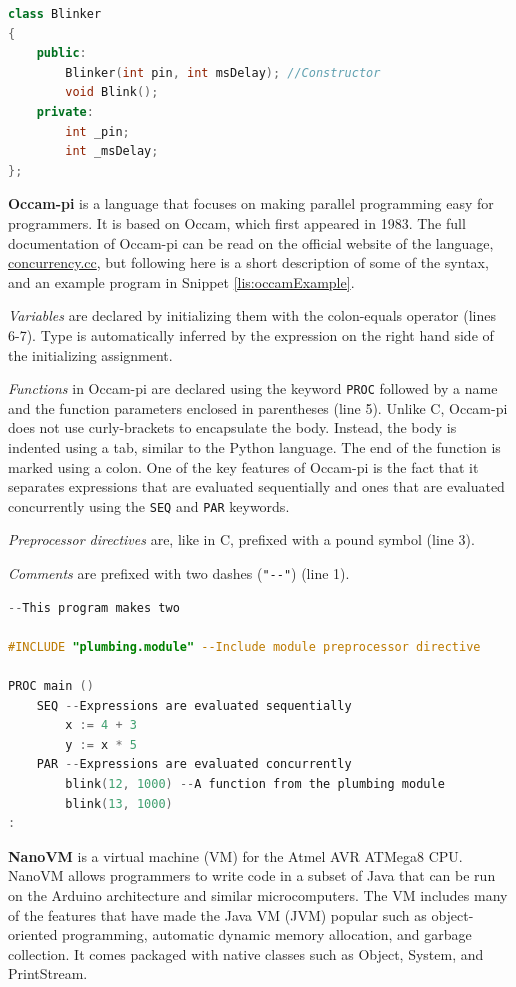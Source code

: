 \begin{lstlisting}[language=C++,label=lis:arduinoHeader,caption=The Blinker.h header file.,firstnumber=1]
class Blinker
{
	public:
		Blinker(int pin, int msDelay); //Constructor
		void Blink();
	private:
		int _pin;
		int _msDelay;
};
\end{lstlisting}

\textbf{Occam-pi} is a language that focuses on making parallel programming easy for programmers.
It is based on Occam, which first appeared in 1983.
The full documentation of Occam-pi can be read on the official website of the language, \url{concurrency.cc}, but following here is a short description of some of the syntax, and an example program in Snippet \ref{lis:occamExample}.

\textit{Variables} are declared by initializing them with the colon-equals operator (lines 6-7). 
Type is automatically inferred by the expression on the right hand side of the initializing assignment.

\textit{Functions} in Occam-pi are declared using the keyword \texttt{PROC} followed by a name and the function parameters enclosed in parentheses (line 5).
Unlike C, Occam-pi does not use curly-brackets to encapsulate the body.
Instead, the body is indented using a tab, similar to the Python language.
The end of the function is marked using a colon.
One of the key features of Occam-pi is the fact that it separates expressions that are evaluated sequentially and ones that are evaluated concurrently using the \texttt{SEQ} and \texttt{PAR} keywords.

\textit{Preprocessor directives} are, like in C, prefixed with a pound symbol (line 3).

\textit{Comments} are prefixed with two dashes (\texttt{"{-}{-}"}) (line 1).

\begin{lstlisting}[language=C,label=lis:occamExample,caption=An example program written in Occam-pi.,firstnumber=1]
--This program makes two 

#INCLUDE "plumbing.module" --Include module preprocessor directive

PROC main ()
	SEQ --Expressions are evaluated sequentially
		x := 4 + 3
		y := x * 5
	PAR --Expressions are evaluated concurrently
		blink(12, 1000) --A function from the plumbing module
		blink(13, 1000)
:
\end{lstlisting}

\textbf{NanoVM} is a virtual machine (VM) for the Atmel AVR ATMega8 CPU.
NanoVM allows programmers to write code in a subset of Java that can be run on the Arduino architecture and similar microcomputers.
The VM includes many of the features that have made the Java VM (JVM) popular such as object-oriented programming, automatic dynamic memory allocation, and garbage collection.
It comes packaged with native classes such as Object, System, and PrintStream.

